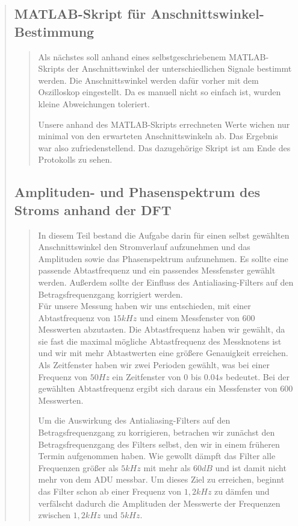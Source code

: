 \begin{quote}
\begin{quote}
	\cite{Schaltungwandlerbox}
	\end{quote}
	
	\subsection{MATLAB-Skript für Anschnittswinkel-Bestimmung}
	\begin{quote}	
	Als nächstes soll anhand eines selbstgeschriebenem MATLAB-Skripts der
	Anschnittswinkel der unterschiedlichen Signale bestimmt werden. Die
	Anschnittswinkel werden dafür vorher mit dem Oszilloskop eingestellt. Da es
	manuell nicht so einfach ist, wurden kleine Abweichungen toleriert.
	
	Unsere anhand des MATLAB-Skripts errechneten Werte wichen nur minimal von den
	erwarteten Anschnittswinkeln ab. Das Ergebnis war also zufriedenstellend. 
    Das dazugehörige Skript ist am Ende des Protokolls zu sehen.
   	\end{quote}
	
	\subsection{Amplituden- und Phasenspektrum des Stroms anhand der DFT}
	\begin{quote}
        In diesem Teil bestand die Aufgabe darin für einen selbst gewählten Anschnittswinkel den Stromverlauf
        aufzunehmen und das Amplituden sowie das Phasenspektrum aufzunehmen. Es sollte eine passende Abtastfrequenz und
        ein passendes Messfenster gewählt werden. Außerdem sollte der Einfluss des Antialiasing-Filters auf den
        Betragsfrequenzgang korrigiert werden.\\
        Für unsere Messung haben wir uns entschieden, mit einer Abtastfrequenz
        von $15kHz$ und einem Messfenster von $600$ Messwerten abzutasten. Die
        Abtastfrequenz haben wir gewählt, da sie fast die maximal mögliche Abtastfrequenz des Messknotens ist und wir mit 
        mehr Abtastwerten eine größere Genauigkeit erreichen. 
        Als Zeitfenster haben wir zwei Perioden gewählt, was bei einer Frequenz von $50Hz$ ein Zeitfenster von $0$ bis
        $0.04 s$ bedeutet. Bei der gewählten Abtastfrequenz ergibt sich daraus ein Messfenster von $600$
        Messwerten.
        
        \vspace{1em}
        
        Um die Auswirkung des Antialiasing-Filters auf den Betragsfrequenzgang
        zu korrigieren, betrachen wir zunächst den Betragsfrequenzgang des
        Filters selbst, den wir in einem früheren Termin aufgenommen haben. Wie gewollt dämpft das Filter alle Frequenzen 
        größer als $5kHz$ mit mehr als $60dB$ und ist damit nicht mehr von dem ADU messbar.
        Um dieses Ziel zu erreichen, beginnt das Filter schon ab einer Frequenz
        von $1,2 kHz$ zu dämfen und verfälscht dadurch die Amplituden der Messwerte der Frequenzen 
        zwischen $1,2 kHz$ und $5 kHz$.
        

\end{quote}
\end{quote}
